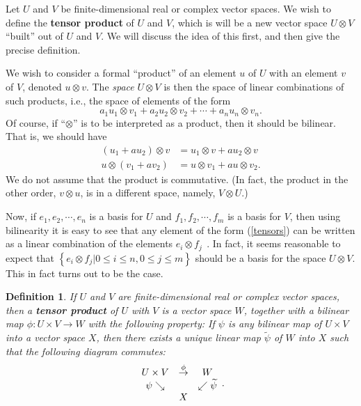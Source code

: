 \documentclass[12pt]{amsbook}
\theoremstyle{plain}
\newtheorem{definition}[theorem]{Definition}
\numberwithin{equation}{chapter}
\numberwithin{theorem}{chapter}
\begin{document}
Let $U$ and $V$ be finite-dimensional real or complex vector spaces. We wish
to define the \textbf{tensor product} of $U$ and $V$, which is will be a new
vector space $U\otimes V$ ``built'' out of $U$ and $V$. We will discuss the
idea of this first, and then give the precise definition.

We wish to consider a formal ``product'' of an element $u$ of $U$ with an
element $v$ of $V$, denoted $u\otimes v$. The \textit{space} $U\otimes V$ is
then the space of linear combinations of such products, i.e., the space of
elements of the form
\begin{equation}
a_{1}u_{1}\otimes v_{1}+a_{2}u_{2}\otimes v_{2}+\cdots+a_{n}u_{n}\otimes
v_{n}\text{.}\label{tensors}%
\end{equation}
Of course, if ``$\otimes$'' is to be interpreted as a product, then it should
be bilinear. That is, we should have
\begin{align*}
\left(  u_{1}+au_{2}\right)  \otimes v  & =u_{1}\otimes v+au_{2}\otimes v\\
u\otimes\left(  v_{1}+av_{2}\right)   & =u\otimes v_{1}+au\otimes
v_{2}\text{.}%
\end{align*}
We do not assume that the product is commutative. (In fact, the product in the
other order, $v\otimes u$, is in a different space, namely, $V\otimes U$.)

Now, if $e_{1},e_{2},\cdots,e_{n}$ is a basis for $U$ and $f_{1},f_{2}%
,\cdots,f_{m}$ is a basis for $V$, then using bilinearity it is easy to see
that any element of the form (\ref{tensors}) can be written as a linear
combination of the elements $e_{i}\otimes f_{j\text{ }}$. In fact, it seems
reasonable to expect that $\left\{  e_{i}\otimes f_{j}\left|  0\leq i\leq
n,0\leq j\leq m\right.  \right\}  $ should be a basis for the space $U\otimes
V$. This in fact turns out to be the case.

\begin{definition}
If $U$ and $V$ are finite-dimensional real or complex vector spaces, then a
\textbf{tensor product} of $U$ with $V$ is a vector space $W$, together with a
bilinear map $\phi:U\times V\rightarrow W$ with the following property: If
$\psi$ is any bilinear map of $U\times V$ into a vector space $X$, then there
exists a unique linear map $\widetilde{\psi}$ of $W$ into $X$ such that the
following diagram commutes:
\[%
\begin{array}
[c]{ccc}%
U\times V & \overset{\phi}{\rightarrow} & W\\
\psi\searrow &  & \swarrow\widetilde{\psi}\\
& X &
\end{array}
\text{.}%
\]
\end{definition}
\end{document}
